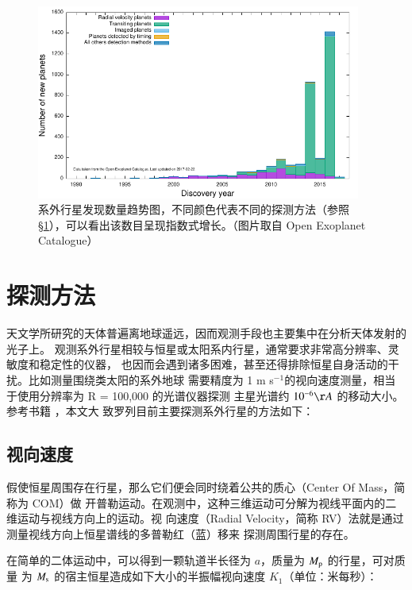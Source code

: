 \begin{figure}[hb]
\centering
\includegraphics[width=0.95\textwidth]{figures/chapter1/fig3_discoveryear.pdf}
\caption{系外行星发现数量趋势图，不同颜色代表不同的探测方法（参照 \S \ref{sec:detmeth}），可以看出该数目呈现指数式增长。（图片取自 Open Exoplanet Catalogue）}
\label{fig:pltdiscyear}
\end{figure}



\section{探测方法} \label{sec:detmeth}

天文学所研究的天体普遍离地球遥远，因而观测手段也主要集中在分析天体发射的光子上。
观测系外行星相较与恒星或太阳系内行星，通常要求非常高分辨率、灵敏度和稳定性的仪器，
也因而会遇到诸多困难，甚至还得排除恒星自身活动的干扰。比如测量围绕类太阳的系外地球
需要精度为 1 m s$^{-1}$的视向速度测量，相当于使用分辨率为 R = 100,000 的光谱仪器探测
主星光谱约 $10^{-6} \AA$ 的移动大小。参考书籍 ，本文大
致罗列目前主要探测系外行星的方法如下：

\subsection{视向速度}

假使恒星周围存在行星，那么它们便会同时绕着公共的质心（Center Of Mass，简称为 COM）做
开普勒运动。在观测中，这种三维运动可分解为视线平面内的二维运动与视线方向上的运动。视
向速度（Radial Velocity，简称 RV）法就是通过测量视线方向上恒星谱线的多普勒红（蓝）移来
探测周围行星的存在。

在简单的二体运动中，可以得到一颗轨道半长径为 $a$，质量为 $M_\mathrm{p}$ 的行星，可对质量
为 $M_\mathrm{s}$ 的宿主恒星造成如下大小的半振幅视向速度 $K_1$（单位：米每秒）：

